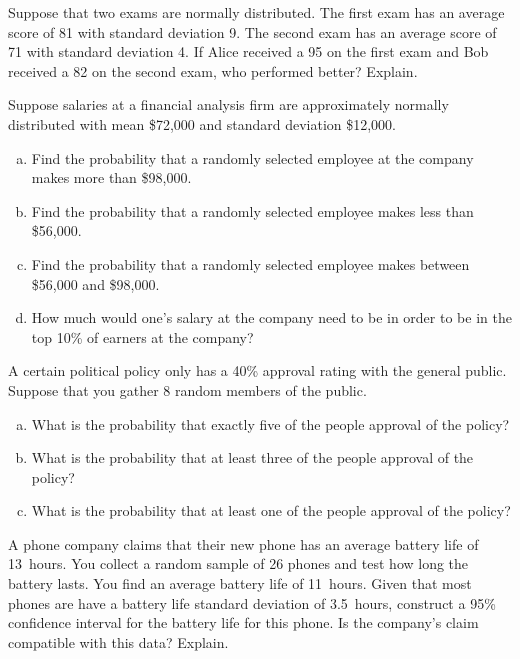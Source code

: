 \documentclass[11pt,letterpaper]{article}
\begin{document}

 Suppose that two exams are normally distributed. The first exam has an average score of 81 with standard deviation 9. The second exam has an average score of 71 with standard deviation 4. If Alice received a 95 on the first exam and Bob received a 82 on the second exam, who performed better? Explain. \pspace





\newpage





 Suppose salaries at a financial analysis firm are approximately normally distributed with mean \$72,000 and standard deviation \$12,000. 
        \begin{enumerate}[(a)]
        \item Find the probability that a randomly selected employee at the company makes more than \$98,000.
        \item Find the probability that a randomly selected employee makes less than \$56,000.
        \item Find the probability that a randomly selected employee makes between \$56,000 and \$98,000.
        \item How much would one's salary at the company need to be in order to be in the top 10\% of earners at the company?
        \end{enumerate} \pspace





\newpage





 A certain political policy only has a 40\% approval rating with the general public. Suppose that you gather 8 random members of the public. 
	\begin{enumerate}[(a)]
	\item What is the probability that exactly five of the people approval of the policy?
	\item What is the probability that at least three of the people approval of the policy?
	\item What is the probability that at least one of the people approval of the policy? 
	\end{enumerate} \pspace





\newpage





 A phone company claims that their new phone has an average battery life of 13~hours. You collect a random sample of 26 phones and test how long the battery lasts. You find an average battery life of 11~hours. Given that most phones are have a battery life standard deviation of 3.5~hours, construct a 95\% confidence interval for the battery life for this phone. Is the company's claim compatible with this data? Explain. \pspace
\end{document}

